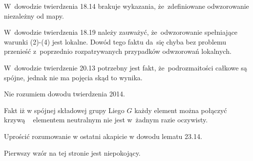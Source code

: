 \documentclass[a4paper,11pt]{article}
\begin{document}
\vspace{\spaceFour}





\noindent
{} W~dowodzie twierdzenia 18.14 brakuje wykazania,
że~zdefiniowane odwzorowanie niezależny od mapy.

\vspace{\spaceFour}





\noindent
{} W~dowodzie twierdzenia 18.19 należy zauważyć,
że~odwzorowanie spełniające warunki (2)-(4) jest lokalne. Dowód tego
faktu da~się chyba bez problemu przenieść z~poprzednio rozpatrywanych
przypadków odwzorowań lokalnych.

\vspace{\spaceFour}





\noindent
{} W~dowodzie twierdzenie 20.13 potrzebny jest fakt,
że~podrozmaitości całkowe są spójne, jednak nie ma pojęcia skąd to
wynika.

\vspace{\spaceFour}





\noindent
{} Nie rozumiem dowodu twierdzenia 2014.

\vspace{\spaceFour}





\noindent
{} Fakt iż w spójnej składowej grupy Liego $G$ każdy
element można połączyć krzywą ~ elementem neutralnym nie jest w~żadnym
razie oczywisty.

\vspace{\spaceFour}





\noindent
{} Uprościć rozumowanie w ostatni akapicie w dowodu
lematu 23.14.

\vspace{\spaceFour}





\noindent
{} Pierwszy wzór na tej stronie jest niepokojący.

\vspace{\spaceFour}
\end{document}
